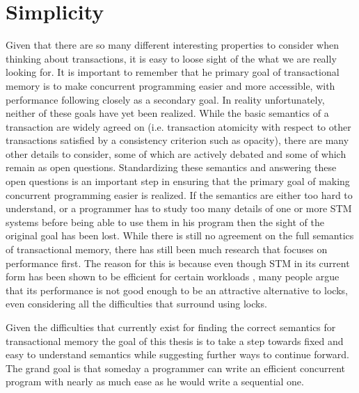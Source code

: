 \section{Simplicity}
Given that there are so many different interesting properties to consider
when thinking about transactions, it is easy to loose sight of the what
we are really looking for.
It is important to remember that he primary goal of transactional memory is to make concurrent programming
easier and more accessible, with performance following closely as a secondary goal.
In reality unfortunately, neither of these goals have yet been realized.
While the basic semantics of a transaction are widely agreed on
(i.e. transaction atomicity with respect to other transactions satisfied by a consistency criterion such as opacity),
there are many other details to consider,
some of which are actively debated and some of which remain as open questions.
Standardizing these semantics and answering these open questions is an important
step in ensuring that the primary goal of making concurrent programming easier
is realized.
If the semantics are either too hard to understand, or a programmer has to study
too many details of one or more STM systems before being able to use them in
his program then the sight of the original goal has been lost.
While there is still no agreement on the full semantics of transactional memory,
there has still been much research that focuses on performance first.
The reason for this is because even though STM in its current form has been shown
to be efficient for certain workloads \cite{DFGG11}, many people argue that
its performance is not good enough to be an attractive alternative to locks, even considering all the
difficulties that surround using locks.

Given the difficulties that currently exist for finding the correct semantics for transactional memory
the goal of this thesis is to take a step towards fixed and easy to understand semantics while suggesting further
ways to continue forward.
The grand goal is that someday a programmer can write an efficient concurrent program
with nearly as much ease as he would write a sequential one.

